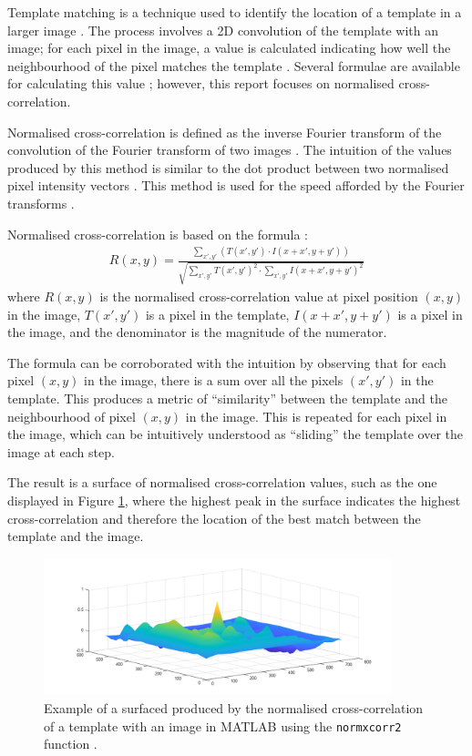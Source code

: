 Template matching is a technique used to identify the location of a template in a larger image \cite{opencv_2023a}. The process involves a 2D convolution of the template with an image; for each pixel in the image, a value is calculated indicating how well the neighbourhood of the pixel matches the template \cite{opencv_2023a}. Several formulae are available for calculating this value \cite{opencv_2023a}; however, this report focuses on normalised cross-correlation.

Normalised cross-correlation is defined as the inverse Fourier transform of the convolution of the Fourier transform of two images \cite{psi_2016}. The intuition of the values produced by this method is similar to the dot product between two normalised pixel intensity vectors \cite{psi_2016}. This method is used for the speed afforded by the Fourier transforms \cite{psi_2016}.

Normalised cross-correlation is based on the formula \cite{opencv_2023a}:
\begin{align}
  R(x,y) = \frac{\sum_{x',y'}\left(T(x',y')\cdot I(x+x',y+y')\right)}{\sqrt{\sum_{x',y'} T(x',y')^2 \cdot \sum_{x',y'} I(x+x',y+y')^2}}
\end{align}
where $R(x,y)$ is the normalised cross-correlation value at pixel position $(x,y)$ in the image, $T(x',y')$ is a pixel in the template, $I(x+x', y+y')$ is a pixel in the image, and the denominator is the magnitude of the numerator.

The formula can be corroborated with the intuition by observing that for each pixel $(x,y)$ in the image, there is a sum over all the pixels $(x',y')$ in the template. This produces a metric of ``similarity'' between the template and the neighbourhood of pixel $(x,y)$ in the image. This is repeated for each pixel in the image, which can be intuitively understood as ``sliding'' the template over the image at each step.

The result is a surface of normalised cross-correlation values, such as the one displayed in Figure \ref{fig:normxcorr2}, where the highest peak in the surface indicates the highest cross-correlation and therefore the location of the best match between the template and the image.

\begin{figure}[ht]
  \centering
  \includegraphics[width=0.9\textwidth]{images/normxcorr2_surface.png}
  \caption{Example of a surfaced produced by the normalised cross-correlation of a template with an image in MATLAB using the \texttt{normxcorr2} function \cite{mathworks_2023a}.}
  \label{fig:normxcorr2}
\end{figure}

